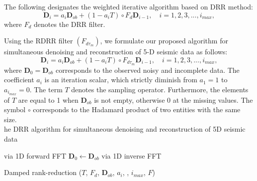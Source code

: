 The following  designates the weighted iterative algorithm based on DRR method:
\begin{equation}
\mathbf{D}_i= a_{i}\mathbf{D}_{ob} + (1 - a_{i}{T})\circ {F}_{d}\mathbf{D}_{i - 1}, \quad i = 1, 2, 3, . . . , i_{max}, 
\end{equation}
where ${F}_d$ denotes the DRR filter.

Using the RDRR filter $({F}_{d\tau_m})$, we formulate our proposed algorithm for simultaneous denoising and reconstruction of 5-D seismic data as follows:
\begin{equation}
\mathbf{D}_i= a_{i}\mathbf{D}_{ob} + (1 - a_{i}{T})\circ {F}_{d\tau_m}\mathbf{D}_{i - 1}, \quad i = 1, 2, 3, . . . , i_{max}, 
\end{equation}
where $\mathbf{D}_0 = \mathbf{D}_{ob}$ corresponds to the observed noisy and incomplete data. The coefficient $a_{i}$ is an iteration scalar, which strictly diminish from $a_1=1$ to $a_{i_{max}}=0$. The term ${T}$ denotes the sampling operator. Furthermore, the elements of ${T}$ are equal to 1 when $ \mathbf{D}_{ob} $ is not empty, otherwise $0$ at the missing values. The symbol $\circ$ corresponds to the Hadamard product of two entities with the same size.\\

he DRR algorithm for simultaneous denoising and reconstruction of 5D seismic data 

\begin{center}
	\begin{algorithm}[H]
		\DontPrintSemicolon
		 via 1D forward FFT\;    
		$\mathbf{D}_0\leftarrow\mathbf{D}_{ob}$\;
		 via 1D inverse FFT\;
		
		\caption{Damped rank-reduction ({${T}$}, {${F}_{d}$}, {$\mathbf{D}_{ob}$}, {$a_{i}$}, \wen{$\epsilon$}, {$i_{max}$}, {${F}$})}
		
	\end{algorithm}
\end{center}

